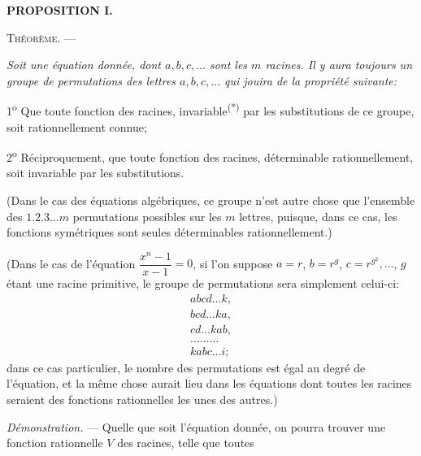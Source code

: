 
\begin{center}{\bfseries PROPOSITION I.}\end{center}

\noindent\textsc{Théorème.} --- {\itshape Soit une équation donnée, dont $a,b,c,\ldots$
sont les $m$ racines. Il y aura toujours un groupe de permutations
des lettres $a,b,c,\ldots$ qui jouira de la propriété suivante:\par

1\textsuperscript{o} Que toute fonction des racines, invariable\textsuperscript{(*)} par les substitutions
de ce groupe, soit rationnellement connue;\par

2\textsuperscript{o} Réciproquement, que toute fonction des racines, déterminable
rationnellement, soit invariable par les substitutions.\par}

(Dans le cas des équations algébriques, ce groupe n'est autre
chose que l'ensemble des $1.2.3\ldots m$ permutations possibles
sur les $m$ lettres, puisque, dans ce cas, les fonctions symétriques
sont seules déterminables rationnellement.)

(Dans le cas de l'équation $\dfrac{x^{n}-1}{x-1}=0$, si l'on suppose $a=r$,
$b=r^{g}$, $c=r^{g^{2}},\ldots$, $g$ étant une racine primitive, le groupe de
permutations sera simplement celui-ci:
\[
\begin{array}{c}
abcd\ldots k,\\
bcd\ldots ka,\\
cd\ldots kab,\\
\ldots\ldots\ldots\\
kabc\ldots i;
\end{array}
\]
dans ce cas particulier, le nombre des permutations est égal au
degré de l'équation, et la même chose aurait lieu dans les équations
dont toutes les racines seraient des fonctions rationnelles
les unes des autres.)

\emph{Démonstration.} --- Quelle que soit l'équation donnée, on pourra
trouver une fonction rationnelle $V$ des racines, telle que toutes

